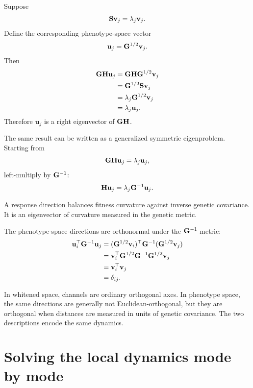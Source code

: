 Suppose
\begin{equation}
\mathbf{S}\mathbf v_j=\lambda_j\mathbf v_j.
\end{equation}
Define the corresponding phenotype-space vector
\begin{equation}
\mathbf u_j=\mathbf{G}^{1/2}\mathbf v_j.
\label{eq:phenotypeChannelDirection}
\end{equation}
Then
\begin{align}
\mathbf{G}\mathbf{H}\mathbf u_j
&=\mathbf{G}\mathbf{H}\mathbf{G}^{1/2}\mathbf v_j\\
&=\mathbf{G}^{1/2}\mathbf{S}\mathbf v_j\\
&=\lambda_j\mathbf{G}^{1/2}\mathbf v_j\\
&=\lambda_j\mathbf u_j.
\end{align}
Therefore \(\mathbf u_j\) is a right eigenvector of \(\mathbf{G}\mathbf{H}\).

The same result can be written as a generalized symmetric eigenproblem. Starting from
\begin{equation}
\mathbf{G}\mathbf{H}\mathbf u_j=\lambda_j\mathbf u_j,
\end{equation}
left-multiply by \(\mathbf{G}^{-1}\):
\begin{equation}
\mathbf{H}\mathbf u_j=\lambda_j\mathbf{G}^{-1}\mathbf u_j.
\label{eq:generalisedEigenproblem}
\end{equation}

\inwords A response direction balances fitness curvature against inverse genetic covariance. It is an eigenvector of curvature measured in the genetic metric.

The phenotype-space directions are orthonormal under the \(\mathbf{G}^{-1}\) metric:
\begin{align}
\mathbf u_i^\top\mathbf{G}^{-1}\mathbf u_j
&=(\mathbf{G}^{1/2}\mathbf v_i)^\top\mathbf{G}^{-1}(\mathbf{G}^{1/2}\mathbf v_j)\\
&=\mathbf v_i^\top\mathbf{G}^{1/2}\mathbf{G}^{-1}\mathbf{G}^{1/2}\mathbf v_j\\
&=\mathbf v_i^\top\mathbf v_j\\
&=\delta_{ij}.
\label{eq:GinverseOrthogonality}
\end{align}

\begin{geombox}
In whitened space, channels are ordinary orthogonal axes. In phenotype space, the same directions are generally not Euclidean-orthogonal, but they are orthogonal when distances are measured in units of genetic covariance. The two descriptions encode the same dynamics.
\end{geombox}

\section{Solving the local dynamics mode by mode}

